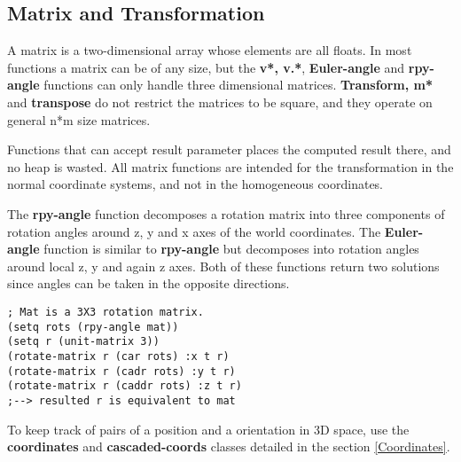 \subsection{Matrix and Transformation}

A matrix is a two-dimensional array whose elements are all floats.
In most functions a matrix can be of any size,
but the {\bf v*, v.*}, {\bf Euler-angle} and {\bf rpy-angle} functions
can only handle three dimensional matrices.
{\bf Transform, m*} and {\bf transpose} do not restrict
the matrices to be square,
and they operate on general n*m size matrices.

Functions that can accept result parameter
places the computed result there, and no heap is wasted.
All matrix functions are intended for the transformation in the normal
coordinate systems, and not in the homogeneous coordinates.

The {\bf rpy-angle} function decomposes a rotation matrix into three components
of rotation angles around z, y and x axes of the world coordinates.
The {\bf Euler-angle} function is similar to {\bf rpy-angle} but
decomposes into rotation angles around local z, y and again z axes.
Both of these functions return two solutions since angles can be
taken in the opposite directions.

\begin{verbatim}
; Mat is a 3X3 rotation matrix.
(setq rots (rpy-angle mat))
(setq r (unit-matrix 3))
(rotate-matrix r (car rots) :x t r)
(rotate-matrix r (cadr rots) :y t r)
(rotate-matrix r (caddr rots) :z t r)
;--> resulted r is equivalent to mat
\end{verbatim}

To keep track of pairs of a position and a orientation in 3D space, use
the {\bf coordinates} and {\bf cascaded-coords} classes
detailed in the section \ref{Coordinates}.

